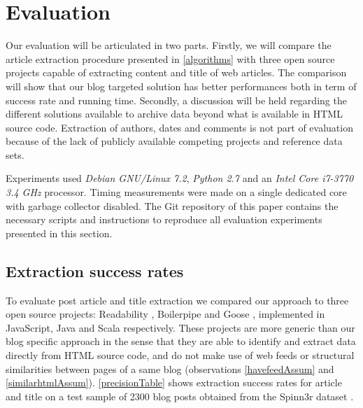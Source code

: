 \section{Evaluation}

Our evaluation will be articulated in two parts. Firstly, we will compare the article extraction procedure presented in \autoref{algorithms} with three open source projects capable of extracting content and title of web articles. The comparison will show that our blog targeted solution has better performances both in term of success rate and running time. Secondly, a discussion will be held regarding the different solutions available to archive data beyond what is available in HTML source code. Extraction of authors, dates and comments is not part of evaluation because of the lack of publicly available competing projects and reference data sets.

Experiments used \emph{Debian GNU/Linux 7.2}, \emph{Python 2.7} and an \emph{Intel Core i7-3770 3.4 GHz} processor. Timing measurements were made on a single dedicated core with garbage collector disabled. The Git repository of this paper \cite{repositoryofthispaper} contains the necessary scripts and instructions to reproduce all evaluation experiments presented in this section.


\subsection{Extraction success rates}
To evaluate post article and title extraction we compared our approach to three open source projects: Readability \cite{python-readability2011}, Boilerpipe \cite{kohlschuetter2010} and Goose \cite{goose2012}, implemented in JavaScript, Java and Scala respectively. These projects are more generic than our blog specific approach in the sense that they are able to identify and extract data directly from HTML source code, and do not make use of web feeds or structural similarities between pages of a same blog (observations \ref{havefeedAssum} and \ref{similarhtmlAssum}). \autoref{precisionTable} shows extraction success rates for article and title on a test sample of 2300 blog posts obtained from the Spinn3r dataset \cite{burton2011}.


\precisionTable

